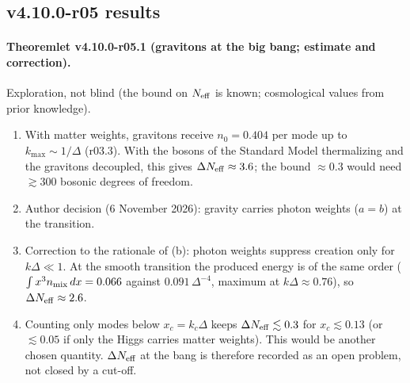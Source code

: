 \subsection*{v4.10.0-r05 results}
\label{subsec:v4100-r05-results}

\paragraph{Theoremlet v4.10.0-r05.1 (gravitons at the big bang; estimate and correction).}
Exploration, not blind (the bound on \(N_{\rm eff}\) is known; cosmological values from prior knowledge).
\begin{enumerate}[leftmargin=2em]
\item[(a)] With matter weights, gravitons receive \(n_0=0.404\) per mode up to \(k_{\max}\sim1/\Delta\) (r03.3).  With the bosons of the Standard Model
thermalizing and the gravitons decoupled, this gives \(\Delta N_{\rm eff}\approx3.6\); the bound \(\approx0.3\) would need \(\gtrsim300\) bosonic degrees of freedom.
\item[(b)] Author decision (6 November 2026): gravity carries photon weights (\(a=b\)) at the transition.
\item[(c)] Correction to the rationale of (b): photon weights suppress creation only for \(k\Delta\ll1\).  At the smooth transition the produced energy
is of the same order (\(\int x^3n_{\rm mix}\,dx=0.066\) against \(0.091\,\Delta^{-4}\), maximum at \(k\Delta\approx0.76\)), so \(\Delta N_{\rm eff}\approx2.6\).
\item[(d)] Counting only modes below \(x_c=k_c\Delta\) keeps \(\Delta N_{\rm eff}\lesssim0.3\) for \(x_c\lesssim0.13\) (or \(\lesssim0.05\) if only the Higgs carries matter
weights).  This would be another chosen quantity.  \(\Delta N_{\rm eff}\) at the bang is therefore recorded as an open problem, not closed by a cut-off.
\end{enumerate}

